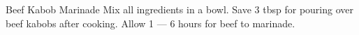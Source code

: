 \documentclass[../cookbook.tex]{subfiles}
\begin{document}
\begin{recipe}{Beef Kabob Marinade}{}{}
    Mix all ingredients in a bowl. Save 3 tbsp for pouring over
    beef kabobs after cooking. Allow 1 --- 6 hours for beef to
    marinade.
\end{recipe}
\end{document}
